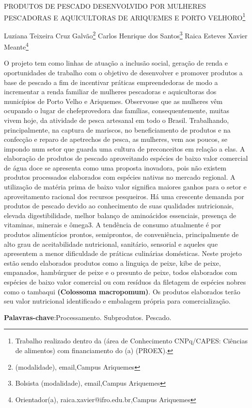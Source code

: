 \documentclass[article,12pt,onesidea,4paper,english,brazil]{abntex2}
\begin{document}
	
	
	\frenchspacing 
	
	\begin{center}
		\LARGE PRODUTOS DE PESCADO DESENVOLVIDO POR MULHERES PESCADORAS E AQUICULTORAS DE ARIQUEMES E PORTO VELHO­RO\footnote{Trabalho realizado dentro da (área de Conhecimento CNPq/CAPES: Ciências de alimentos) com financiamento do (a) (PROEX).}
		
		\normalsize
		Luziana Teixeira Cruz Galvão\footnote{(modalidade), email,Campus Ariquemes} 
		Carlos Henrique dos Santos\footnote{Bolsista (modalidade), email,Campus Ariquemes} 
		Raica Esteves Xavier Meante\footnote{Orientador(a), raica.xavier@ifro.edu.br,Campus Ariquemes}  
	\end{center}
	
	\noindent O projeto tem como linhas de atuação a inclusão social, geração de renda e oportunidades de trabalho com o objetivo de desenvolver e promover produtos a base de pescado a fim de incentivar práticas empreendedoras de modo a incrementar a renda familiar de mulheres pescadoras e aquicultoras dos municípios de Porto Velho e Ariquemes. Observou­se que as mulheres vêm ocupando o lugar de chefe­provedora das famílias, consequentemente, muitas vivem hoje, da atividade de pesca artesanal em todo o Brasil. Trabalhando, principalmente, na captura de mariscos, no beneficiamento de produtos e na confecção e reparo de apetrechos de pesca, as mulheres, vem aos poucos, se impondo num setor que guarda uma cultura de preconceitos em relação a elas. A elaboração de produtos de pescado aproveitando espécies de baixo valor comercial de água doce se apresenta como uma proposta inovadora, pois não existem produtos processados elaborados com espécies nativas no mercado regional. A utilização de matéria prima de baixo valor significa maiores ganhos para o setor e aproveitamento racional dos recursos pesqueiros. Há uma crescente demanda por produtos de pescado devido ao conhecimento de suas qualidades nutricionais, elevada digestibilidade, melhor balanço de aminoácidos essenciais, presença de vitaminas, minerais e ômega­3. A tendência de consumo atualmente é por produtos alimentícios prontos, semiprontos, de conveniência, principalmente de alto grau de aceitabilidade nutricional, sanitário, sensorial e aqueles que apresentem a menor dificuldade de práticas culinárias domésticas. Neste projeto estão sendo elaborados produtos como a linguiça de peixe, kibe de peixe, empanados, hambúrguer de peixe e o presunto de peixe, todos elaborados com espécies de baixo valor comercial ou com resíduos da filetagem de espécies nobres como o tambaqui \textbf{(Colossoma macropomum)}. Os produtos elaborados terão seu valor nutricional identificado e embalagem própria para comercialização.
	
	\vspace{\onelineskip}
	
	\noindent
	\textbf{Palavras-chave}:Processamento. Subprodutos. Pescado.
	
\end{document}
